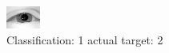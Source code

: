 \begin{figure}[h!]
\begin{center}
\includegraphics[width=0.60\columnwidth]{figures/ID2375_class_1_target_2.png}
\end{center}
\caption{ Classification: 1 actual target: 2}
\label{fig:ID2375_class_1_target_2}
\end{figure}
